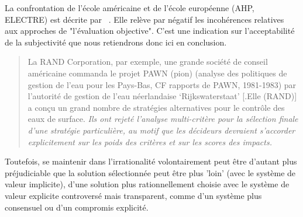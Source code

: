 La confrontation de l'école américaine et de l'école européenne (AHP, ELECTRE) est décrite par \citeauthor{lootsma_french_1990}~\cite{lootsma_french_1990}.
Elle relève par négatif les incohérences relatives aux approches de "l'évaluation objective".
C'est une indication sur l'acceptabilité de la subjectivité que nous retiendrons donc ici en conclusion.
\blockcquote[traduction]{lootsma_french_1990}{
La RAND Corporation, par exemple, une grande société de conseil américaine commanda le projet PAWN (pion) (analyse des politiques de gestion de l'eau pour les Pays-Bas, CF rapports de PAWN, 1981-1983) par l'autorité de gestion de l'eau néerlandaise `Rijkswaterstaat'
[.Elle (RAND)] a conçu un grand nombre de stratégies alternatives pour le contrôle des eaux de surface.
\emph{Ils ont rejeté l'analyse multi-critère pour la sélection finale d'une stratégie particulière, au motif que les décideurs devraient s'accorder explicitement sur les poids des critères et sur les scores des impacts.}
}
Toutefois, se maintenir dans l'irrationalité volontairement peut être d'autant plus préjudiciable que la solution sélectionnée peut être plus 'loin' (avec le système de valeur implicite), d'une solution plus rationnellement choisie avec le système de valeur explicite controversé mais transparent, comme d'un système plus consensuel ou d'un compromis explicité.


